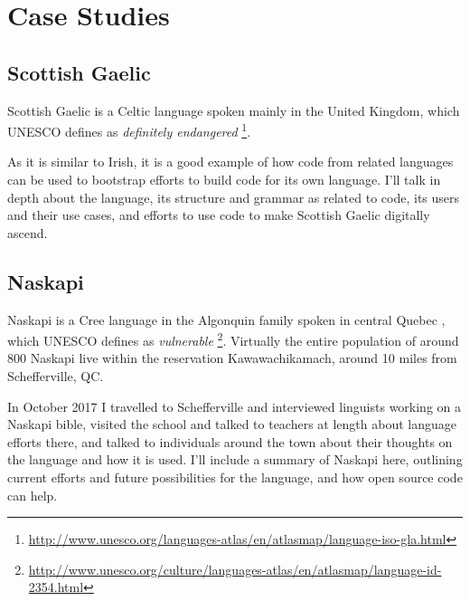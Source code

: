 \section{Case Studies}\label{sec:case-studies}
\subsection{Scottish Gaelic}

Scottish Gaelic is a Celtic language spoken mainly in the United Kingdom, which UNESCO defines as {\it definitely endangered} \footnote{\href{http://www.unesco.org/languages-atlas/en/atlasmap/language-iso-gla.html}{http://www.unesco.org/languages-atlas/en/atlasmap/language-iso-gla.html}}. %

As it is similar to Irish, it is a good example of how code from related languages can be used to bootstrap efforts to build code for its own language. I'll talk in depth about the language, its structure and grammar as related to code, its users and their use cases, and efforts to use code to make Scottish Gaelic digitally ascend.


\subsection{Naskapi}


Naskapi is a Cree language in the Algonquin family spoken in central Quebec \cite{MacKenzie-and-Jancewicz-1994}, which UNESCO defines as {\it vulnerable} \footnote{\href{http://www.unesco.org/culture/languages-atlas/en/atlasmap/language-id-2354.html}{http://www.unesco.org/culture/languages-atlas/en/atlasmap/language-id-2354.html}}. Virtually the entire population of around 800 Naskapi live within the reservation Kawawachikamach, around 10 miles from Schefferville, QC.

In October 2017 I travelled to Schefferville and interviewed linguists working on a Naskapi bible, visited the school and talked to teachers at length about language efforts there, and talked to individuals around the town about their thoughts on the language and how it is used. I'll include a summary of Naskapi here, outlining current efforts and future possibilities for the language, and how open source code can help.

